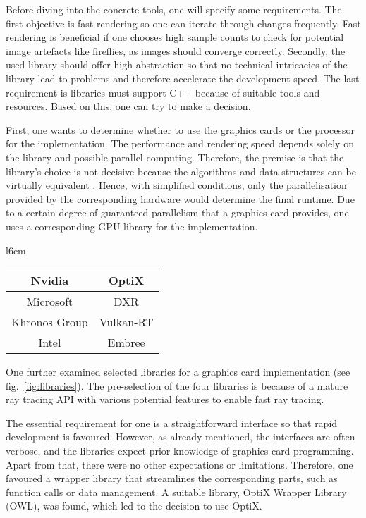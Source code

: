 Before diving into the concrete tools, one will specify some requirements.
The first objective is fast rendering so one can iterate through changes frequently.
Fast rendering is beneficial if one chooses high sample counts to check for potential image artefacts like fireflies, as images should converge correctly.
Secondly, the used library should offer high abstraction so that no technical intricacies of the library lead to problems and therefore accelerate the development speed.
The last requirement is libraries must support C++ because of suitable tools and resources.
Based on this, one can try to make a decision.

First, one wants to determine whether to use the graphics cards or the processor for the implementation.
The performance and rendering speed depends solely on the library and possible parallel computing.
Therefore, the premise is that the library's choice is not decisive because the algorithms and data structures can be virtually equivalent \cite{bico_optix_2016}.
Hence, with simplified conditions, only the parallelisation provided by the corresponding hardware would determine the final runtime. 
Due to a certain degree of guaranteed parallelism that a graphics card provides, one uses a corresponding GPU library for the implementation.

\begin{wraptable}{l}{6cm}
    \begin{tabular}{|c|c|}\hline
        Nvidia        & OptiX     \\ \hline
        Microsoft     & DXR       \\ \hline
        Khronos Group & Vulkan-RT \\ \hline
        Intel         & Embree    \\ \hline
    \end{tabular}
    \caption{libraries}
    \label{fig:libraries}
\end{wraptable}

One further examined selected libraries for a graphics card implementation (see fig.~\ref{fig:libraries}).
The pre-selection of the four libraries is because of a mature ray tracing API with various potential features to enable fast ray tracing.

The essential requirement for one is a straightforward interface so that rapid development is favoured.
However, as already mentioned, the interfaces are often verbose, and the libraries expect prior knowledge of graphics card programming.
Apart from that, there were no other expectations or limitations.
Therefore, one favoured a wrapper library that streamlines the corresponding parts, such as function calls or data management.
A suitable library, OptiX Wrapper Library (OWL), was found, which led to the decision to use OptiX.

